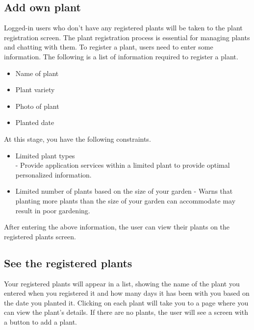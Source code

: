 \documentclass[conference, a4paper]{IEEEtran}
\begin{document}
\subsection{Add own plant}
Logged-in users who don't have any registered plants will be taken to the plant registration screen. The plant registration process is essential for managing plants and chatting with them. To register a plant, users need to enter some information. The following is a list of information required to register a plant.
\begin{itemize}
    \item Name of plant
    \item Plant variety
    \item Photo of plant
    \item Planted date
\end{itemize}
At this stage, you have the following constraints. 
\begin{itemize}
    \item Limited plant types 
    \\ - Provide application services within a limited plant to provide optimal personalized information.
    \item Limited number of plants based on the size of your garden - Warns that planting more plants than the size of your garden can accommodate may result in poor gardening.\\
\end{itemize}
After entering the above information, the user can view their plants on the registered plants screen. \\
\subsection{See the registered plants}
Your registered plants will appear in a list, showing the name of the plant you entered when you registered it and how many days it has been with you based on the date you planted it. Clicking on each plant will take you to a page where you can view the plant's details. If there are no plants, the user will see a screen with a button to add a plant.\\
\end{document}
